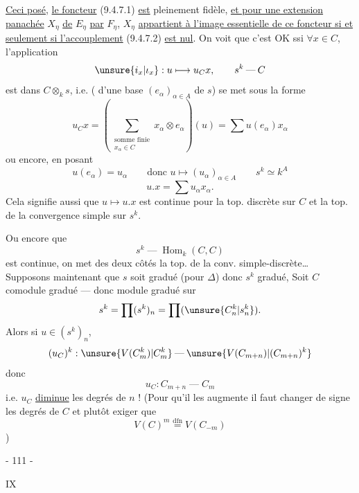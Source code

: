 \uline{Ceci posé}, \uline{le foncteur} (9.4.7.1) \uline{est} pleinement fidèle, \uline{et pour une extension panachée} $X_\eta$ \uline{de} $E_\eta$ \uline{par} $F_\eta$, $X_\eta$ \uline{appartient à l'image essentielle de ce foncteur si et seulement si l'accouplement} (9.4.7.2) \uline{est nul}.
On voit que c'est OK ssi $\forall x\in C$, l'application
\[
 \unsure{i_x|\iota_x}:u\longmapsto u_Cx,\qquad s^k\mathbin{\text{---}}C
\]
est dans $C\otimes_k s$,  i.e. ( d'une base $(e_\alpha)_{\alpha\in A}$ de $s$) se met sous la forme
\[
 u_Cx=\left(\sum_{\substack{\text{somme finie}\\x_\alpha\in C}}x_\alpha\otimes e_\alpha\right)(u)
 =\sum u(e_\alpha)x_\alpha
\]
ou encore, en posant
\[
 u(e_\alpha)=u_\alpha\qquad\text{donc }u\longmapsto(u_\alpha)_{\alpha\in A}\qquad s^k\simeq k^A
\]
\[
 u.x=\sum u_\alpha x_\alpha.
\]
Cela signifie aussi que $u\longmapsto u.x$ est continue pour la top. discrète sur $C$ et la top. de la convergence simple sur $s^k$.

Ou encore que
\[
 s^k\mathbin{\text{---}}\operatorname{Hom}_k(C,C)
\]
est continue,  on met des deux côtés la top. de la conv. simple-discrète\ldots
{}
Supposons maintenant que $s$ soit gradué
(pour $\Delta$) donc $s^k$ gradué,
Soit $C$ comodule gradué --- donc
module gradué sur
\[
 s^k=\prod(s^k)_n=\prod(\unsure{C_n^k|s_n^k}).
\]
Alors  si $u\in(s^k)_n$,
\[
 (u_C)^k:\unsure{V(C_m^k)|C_m^k}\mathbin{\text{---}}\unsure{V(C_{m+n})|(C_{m+n})^k}
\]
donc
\[
 u_C:C_{m+n}\mathbin{\text{---}}C_m
\]
i.e. $u_C$ \uline{diminue} les degrés de $n$ ! (Pour qu'il les augmente il faut changer de signe les degrés de $C$ et plutôt exiger que
\[
 V(C)^m\overset{\mathrm{dfn}}=V(C_{-m})
\]
\unsure{---})
\begin{center}- 111 -\end{center}\hfill IX

